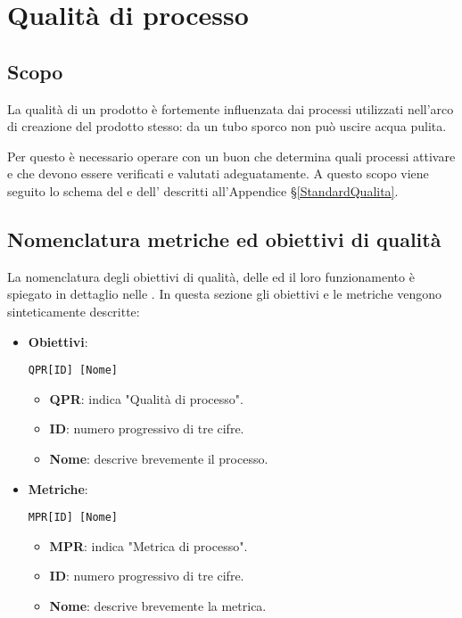 \section{Qualità di processo}\label{QualitaProcesso}

\subsection{Scopo}
La qualità di un prodotto è fortemente influenzata dai processi utilizzati nell'arco di creazione del prodotto stesso: da un tubo sporco non può uscire acqua pulita.

Per questo è necessario operare con un buon  che
determina quali processi attivare e che devono essere verificati e valutati adeguatamente. A questo scopo viene seguito lo schema del  e dell' descritti all'Appendice \S\ref{StandardQualita}.


\subsection{Nomenclatura metriche ed obiettivi di qualità}	\label{nomenclatura}
La nomenclatura degli obiettivi di qualità, delle  ed il loro funzionamento è spiegato in dettaglio nelle \NdP. In questa sezione gli obiettivi e le metriche vengono sinteticamente descritte:

	\begin{itemize}
		\item \textbf{Obiettivi}: 
		
		\begin{center}
			\texttt{QPR[ID] [Nome]}
		\end{center} 
		
		\begin{itemize}
			\item \textbf{QPR}: indica "Qualità di processo".
			\item \textbf{ID}: numero progressivo di tre cifre.
			\item \textbf{Nome}: descrive brevemente il processo.
		\end{itemize}
		
		\item \textbf{Metriche}:
		
		\begin{center}
			\texttt{MPR[ID] [Nome]}
		\end{center}
		
		\begin{itemize}
			\item \textbf{MPR}: indica "Metrica di processo".
			\item \textbf{ID}: numero progressivo di tre cifre.
			\item \textbf{Nome}: descrive brevemente la metrica.
		\end{itemize}
		
	\end{itemize}




